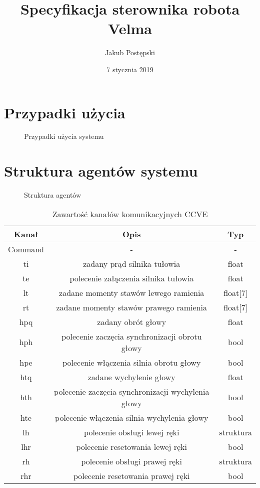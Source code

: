 \documentclass[]{article}
\title{Specyfikacja sterownika robota Velma}
\author{Jakub Postępski}
\date{7 stycznia 2019}
\begin{document}
\maketitle

\section{Przypadki użycia}

\begin{figure}[H]
	\centering
	\caption{Przypadki użycia systemu}
	\label{fig:uc}
\end{figure}

\section{Struktura agentów systemu}

\begin{figure}[H]
	\centering
	\caption{Struktura agentów}
	\label{fig:agents}
\end{figure}


\begin{table}[H]
	\begin{tabular}{||c|cc||}
		\hline
		Kanał & Opis & Typ \\
		\hline\hline
		Command & - & - \\
		ti & zadany prąd silnika tułowia & float \\
		te & polecenie załączenia silnika tułowia & float \\
		lt & zadane momenty stawów lewego ramienia & float[7] \\
		rt & zadane momenty stawów prawego ramienia & float[7] \\
		hpq & zadany obrót głowy & float \\
		hph & polecenie zaczęcia synchronizacji obrotu głowy & bool \\
		hpe & polecenie włączenia silnia obrotu głowy & bool \\
		htq & zadane wychylenie głowy & float \\
		hth & polecenie zaczęcia synchronizacji wychylenia  głowy & bool \\
		hte & polecenie włączenia silnia wychylenia  głowy & bool \\
		lh & polecenie obsługi lewej ręki & struktura \\
		lhr & polecenie resetowania lewej ręki & bool \\
		rh & polecenie obsługi prawej ręki & struktura \\
		rhr & polecenie resetowania prawej ręki & bool \\
		
		\hline
	\end{tabular}
	\caption{Zawartość kanałów komunikacyjnych CCVE}
\end{table}
\end{document}
